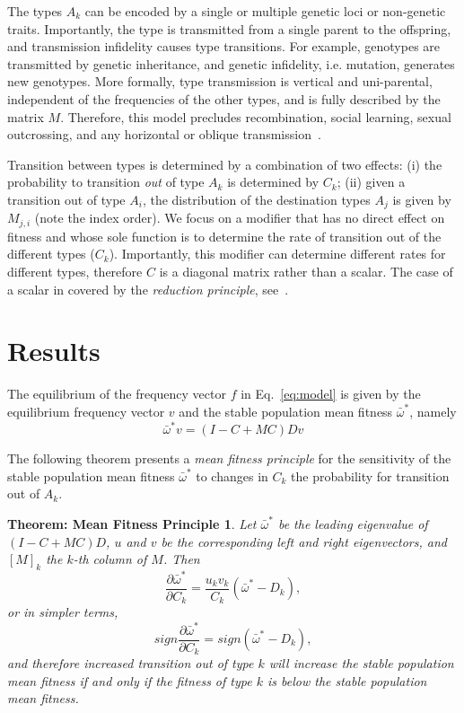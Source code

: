 \documentclass[9pt, a4paper, twocolumn]{extarticle}   	%
\newtheorem*{mfp}{Theorem: Mean Fitness Principle}
\begin{document}
The types $A_k$ can be encoded by a single or multiple genetic loci or non-genetic traits.
Importantly, the type is transmitted from a single parent to the offspring, and transmission infidelity causes type transitions. For example, genotypes are transmitted by genetic inheritance, and genetic infidelity, i.e. mutation, generates new genotypes.
More formally, type transmission is vertical and uni-parental, independent of the frequencies of the other types, and is fully described by the matrix $M$.
Therefore, this model precludes recombination, social learning, sexual outcrossing, and any horizontal or oblique transmission~\cite[pg.~54]{Cavalli-Sforza1981}.

Transition between types is determined by a combination of two effects:
(i) the probability to transition \emph{out} of type $A_k$ is determined by $C_k$;
(ii) given a transition out of type $A_i$, the distribution of the destination types $A_j$ is given by $M_{j,i}$ (note the index order).
We focus on a modifier that has no direct effect on fitness and whose sole function is to determine the rate of transition out of the different types ($C_k$).
Importantly, this modifier can determine different rates for different types, therefore $C$ is a diagonal matrix rather than a scalar. The case of a scalar in covered by the \emph{reduction principle}, see~\citet{Altenberg2017}.

\section*{Results}

The equilibrium of the frequency vector $f$ in Eq.~\ref{eq:model} is given by the equilibrium frequency vector $v$ and the stable population mean fitness
$\bar{\omega}^*$, namely
\begin{equation}\label{eq:model_equilibrium}
\bar{\omega}^* v = (I-C+MC)D v
\end{equation}

The following theorem presents a \emph{mean fitness principle} for the
sensitivity of the stable population mean fitness $\bar{\omega}^*$ to changes
in $C_k$ the probability for transition out of $A_k$.

\begin{mfp}
Let $\bar{\omega}^*$ be the leading eigenvalue of $(I-C+MC)D$, $u$ and $v$ be the corresponding left and right eigenvectors, and $[M]_k$ the $k$-th column of $M$. Then
\begin{equation}\label{eq:theorem}
\frac{\partial \bar{\omega}^*}{\partial C_k} = 
\frac{u_k v_k}{C_k} (\bar{\omega}^* - D_k),
\end{equation}
or in simpler terms,
\begin{equation}
sign\frac{\partial \bar{\omega}^*}{\partial C_k} = 
sign(\bar{\omega}^* - D_k), 
\end{equation}
and therefore increased transition out of type $k$ will increase the stable population mean fitness if and only if the fitness of type $k$ is below the stable population mean fitness.
\end{mfp}
\end{document}
